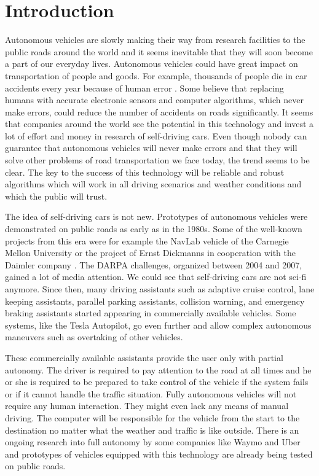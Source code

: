 \chapter*{Introduction}

Autonomous vehicles are slowly making their way from research facilities to the public roads around the world and it seems inevitable that they will soon become a part of our everyday lives. Autonomous vehicles could have great impact on transportation of people and goods. For example, thousands of people die in car accidents every year because of human error \cite{Road_accidents}. Some believe that replacing humans with accurate electronic sensors and computer algorithms, which never make errors, could reduce the number of accidents on roads significantly. It seems that companies around the world see the potential in this technology and invest a lot of effort and money in research of self-driving cars. Even though nobody can guarantee that autonomous vehicles will never make errors and that they will solve other problems of road transportation we face today, the trend seems to be clear. The key to the success of this technology will be reliable and robust algorithms which will work in all driving scenarios and weather conditions and which the public will trust.

The idea of self-driving cars is not new. Prototypes of autonomous vehicles were demonstrated on public roads as early as in the 1980s. Some of the well-known projects from this era were for example the NavLab vehicle of the Carnegie Mellon University \cite{NavLab} or the project of Ernst Dickmanns in cooperation with the Daimler company \cite{Ernst_Dickmanns}. The DARPA challenges, organized between 2004 and 2007, gained a lot of media attention. We could see that self-driving cars are not sci-fi anymore. Since then, many driving assistants such as adaptive cruise control, lane keeping assistants, parallel parking assistants, collision warning, and emergency braking assistants started appearing in commercially available vehicles. Some systems, like the Tesla Autopilot, go even further and allow complex autonomous maneuvers such as overtaking of other vehicles.

These commercially available assistants provide the user only with partial autonomy. The driver is required to pay attention to the road at all times and he or she is required to be prepared to take control of the vehicle if the system fails or if it cannot handle the traffic situation. Fully autonomous vehicles will not require any human interaction. They might even lack any means of manual driving. The computer will be responsible for the vehicle from the start to the destination no matter what the weather and traffic is like outside. There is an ongoing research into full autonomy by some companies like Waymo and Uber and prototypes of vehicles equipped with this technology are already being tested on public roads.

